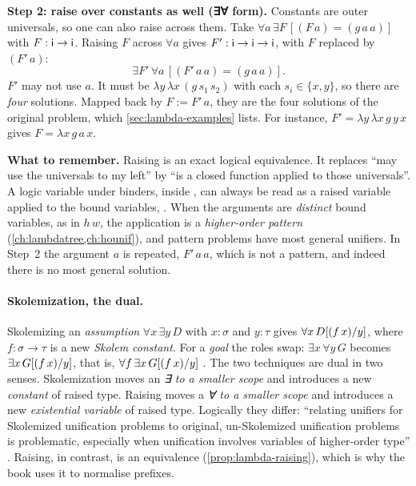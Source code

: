 {\begin{tutorial}
\textbf{Step 2: raise over constants as well (∃∀ form).} Constants are outer universals, so one can
also raise across them. Take $\forall a\,\exists F\,[(F\,a)=(g\,a\,a)]$ with $F:\mathsf{i}\to\mathsf{i}$.
Raising $F$ across $\forall a$ gives $F':\mathsf{i}\to\mathsf{i}\to\mathsf{i}$, with $F$ replaced by $(F'\,a)$:
\[
  \exists F'\,\forall a\,[(F'\,a\,a)=(g\,a\,a)].
\]
$F'$ may not use $a$. It must be $\lambda y\,\lambda x\,(g\,s_1\,s_2)$ with each $s_i\in\{x,y\}$, so there
are \emph{four} solutions. Mapped back by $F:=F'\,a$, they are the four solutions of the original
problem, which \cref{sec:lambda-examples} lists. For instance, $F'=\lambda y\,\lambda x\,g\,y\,x$ gives
$F=\lambda x\,g\,a\,x$.

\textbf{What to remember.} Raising is an exact logical equivalence. It replaces \enquote{may use the
universals to my left} by \enquote{is a closed function applied to those universals}. A logic variable
under binders,  inside , can always be read as a raised variable applied to the bound
variables, . When the arguments are \emph{distinct} bound variables, as in $h\,w$, the
application is a \emph{higher-order pattern} (\cref{ch:lambdatree,ch:hounif}), and pattern problems
have most general unifiers. In Step~2 the argument $a$ is repeated, $F'\,a\,a$, which is not a pattern,
and indeed there is no most general solution.
\end{tutorial}

\paragraph{Skolemization, the dual.} Skolemizing an \emph{assumption} $\forall x\,\exists y\,D$ with
$x:\sigma$ and $y:\tau$ gives $\forall x\,D[(f\,x)/y]$, where $f:\sigma\to\tau$ is a new
\emph{Skolem constant}. For a \emph{goal} the roles swap: $\exists x\,\forall y\,G$ becomes
$\exists x\,G[(f\,x)/y]$, that is, $\forall f\,\exists x\,G[(f\,x)/y]$ . The
two techniques are dual in two senses. Skolemization moves an \emph{∃ to a smaller scope} and
introduces a new \emph{constant} of raised type. Raising moves a \emph{∀ to a smaller scope} and
introduces a new \emph{existential variable} of raised type. Logically they differ: \enquote{relating
unifiers for Skolemized unification problems to original, un-Skolemized unification problems is
problematic, especially when unification involves variables of higher-order type} . Raising,
in contrast, is an equivalence (\cref{prop:lambda-raising}), which is why the book uses it to normalise
prefixes.

}
